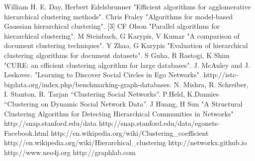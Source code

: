 \documentclass[11pt,onecolumn]{article}
\begin{document}





\begin{thebibliography}{1}
\small
{} William H. E. Day, Herbert Edelsbrunner "Efficient algorithms for agglomerative hierarchical clustering methods".
Chris Fraley "Algorithms for model-based Gaussian hierarchical clustering".
[3] CF Olson "Parallel algorithms for hierarchical clustering".
M Steinbach, G Karypis, V Kumar "A comparison of document clustering techniques".
Y Zhao, G Karypis "Evaluation of hierarchical clustering algorithms for document datasets".
S Guha, R Rastogi, K Shim "CURE: an efficient clustering algorithm for large databases".
J. McAuley and J. Leskovec. "Learning to Discover Social Circles in Ego Networks".
http://istc-bigdata.org/index.php/benchmarking-graph-databases.
N. Mishra, R. Schreiber, I. Stanton, R. Tarjan “Clustering Social Networks”.
P.Held, K.Dannies “Clustering on Dynamic Social Network Data”.
 J Huang, H Sun "A Structural Clustering Algorithm for Detecting Hierarchical Communities in Networks"
 http://snap.stanford.edu/data
 http://snap.stanford.edu/data/egonets-Facebook.html
 http://en.wikipedia.org/wiki/Clustering\_coefficient
 http://en.wikipedia.org/wiki/Hierarchical\_clustering
 http://networkx.github.io
 http://www.neo4j.org
 http://graphlab.com

\end{thebibliography}
\end{document}
